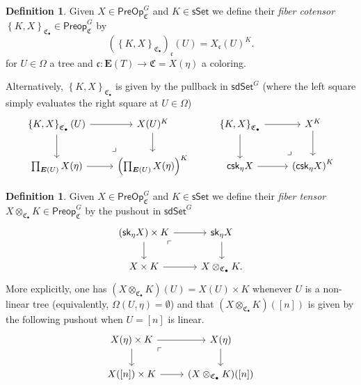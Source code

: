 \documentclass[a4paper,10pt
,draft
]{article}%
\numberwithin{equation}{section}
\numberwithin{figure}{section}
\theoremstyle{definition} %
\newtheorem{definition}[equation]{Definition}%
\newcommand{\1}{\ensuremath{\mathbbm 1}}%
\begin{document}
\begin{definition}
	Given $X \in \mathsf{PreOp}^{G}_{\mathfrak{C}}$ 
	and $K \in \mathsf{sSet}$
	we define their
	\emph{fiber cotensor} 
	$\left\{K, X \right\}_{\mathsf{\mathfrak{C}_{\bullet}}} \in \mathsf{Preop}^G_{\mathfrak{C}}$
	by
	\begin{equation}\label{EASYCOTEN EQ}
	\left(
	\left\{ K, X \right\}_{\mathsf{\mathfrak{C}_{\bullet}}}
	\right)_{\mathfrak{c}} (U)
	=
	X_{\mathfrak{c}}(U)^K.
	\end{equation}	
	for $U \in \Omega$ a tree and 
	$\mathfrak{c} \colon \boldsymbol{E}(T) \to \mathfrak{C} =  X(\eta)$
	a coloring.
	
	Alternatively, 
	$\left\{K, X \right\}_{\mathsf{\mathfrak{C}_{\bullet}}}$
	is given by the pullback in $\mathsf{sdSet}^G$
	(where the left square simply evaluates the right square
	at $U \in \Omega$)
\begin{equation}
\begin{tikzcd}
	\left\{ K, X \right\}_{\mathsf{\mathfrak{C}_{\bullet}}} (U) \ar{r} \ar{d}
&
	X(U)^K \ar{d}
&%
	\left\{ K, X \right\}_{\mathsf{\mathfrak{C}_{\bullet}}} \ar{r} \ar{d}
&
	X^K \ar{d}
\\
	\prod_{\boldsymbol{E}(U)} X(\eta) \ar{r}
&
	\left(\prod_{\boldsymbol{E}(U)} X(\eta)\right)^K
	\arrow[lu, phantom, "\lrcorner", very near start]
&%
	\mathsf{csk}_{\eta} X  \ar{r}
&
	\left(\mathsf{csk}_{\eta} X\right)^K
	\arrow[lu, phantom, "\lrcorner", very near start]
\end{tikzcd}
\end{equation}
\end{definition}



\begin{definition}
	Given $X \in \mathsf{PreOp}^{G}_{\mathfrak{C}}$ 
	and $K \in \mathsf{sSet}$
	we define their
	\emph{fiber tensor}
	$X \otimes_{\mathfrak{C}_{\bullet}} K
	\in \mathsf{Preop}^G_{\mathfrak{C}}$
	by the pushout in $\mathsf{sdSet}^G$
\begin{equation}\label{PREOPTENS EQ}
\begin{tikzcd}
	\left(\mathsf{sk}_{\eta}X \right) \times K \ar{r} \ar{d} \arrow[dr, phantom, "\ulcorner", very near start]  
&
	\mathsf{sk}_{\eta}X \ar{d}
\\
	X \times K \ar{r} 
& 
	X \otimes_{\mathfrak{C}_{\bullet}} K.
\end{tikzcd}
\end{equation}
More explicitly, 
one has
$(X \otimes_{\mathfrak{C}_{\bullet}} K)(U) = X(U) \times K$
whenever $U$ is a non-linear tree 
(equivalently, $\Omega(U,\eta)=\emptyset$)
and that $(X \otimes_{\mathfrak{C}_{\bullet}} K)([n])$
is given by the following pushout when $U=[n]$ is linear.
\[
\begin{tikzcd}
	X(\eta) \times K \ar{r} \ar{d} \arrow[dr, phantom, "\ulcorner", very near start]  
&
	X(\eta) \ar{d}
\\
	X([n]) \times K \ar{r} 
& 
	(X \otimes_{\mathfrak{C}_{\bullet}} K)([n]) 
\end{tikzcd}
\]
\end{definition}
\end{document}

